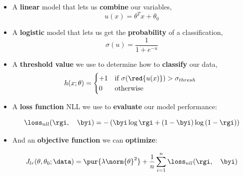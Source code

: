     \begin{itemize}
        \item A \textbf{linear} model that lets us \textbf{combine} our variables,
            \begin{equation}
                u(x) = \theta^T x + \theta_0
            \end{equation}
            
        \item A \textbf{logistic} model that lets us get the \textbf{probability} of a classification,
            \begin{equation}
                \sigma(u) = \frac{1}{1+e^{-u}}
            \end{equation}
            
        \item A \textbf{threshold value} we use to determine how to \textbf{classify} our data,
            \begin{equation}
                h(x; \theta) = 
                \begin{cases}
                    +1 & \text{if $\sigma(\red{u(x)})>\sigma_{thresh}$ }\\
                    0 & \text{otherwise}
                \end{cases}
            \end{equation}
            
        \item A \textbf{loss function} NLL we use to \textbf{evaluate} our model performance:
        
            \begin{equation*}
                \loss_{nll}
                (\rgi ,\quad \byi)
                =
                -
                \left(
                    \byi \log{\rgi}
                    +
                    \left( 1 - \byi \right)
                    \log
                    \left( 1-\rgi \right) 
                \right)
            \end{equation*}
            
        \item And an \textbf{objective function} we can \textbf{optimize}:
        
            \begin{equation}
                J_{lr}(\theta,\theta_0;\data)
                =
                \pur{ \lambda \norm{\theta}^2 }
                +
                \frac{1}{n} \sum_{i=1}^n 
                    \loss_{nll}(\rgi ,\quad \byi)
            \end{equation}
    \end{itemize}
    
